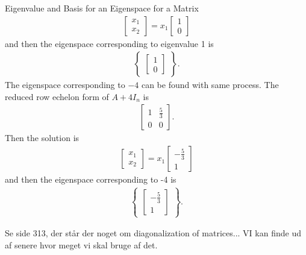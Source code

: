 \begin{example}{Eigenvalue and Basis for an Eigenspace for a Matrix}
\begin{align*}
\begin{bmatrix}
            x_1\\x_2
        \end{bmatrix}=x_1
         \begin{bmatrix}
            1\\0
        \end{bmatrix}
    \end{align*}
    and then the eigenspace corresponding to eigenvalue 1 is
    \begin{align*}
    \begin{Bmatrix}
        \begin{bmatrix}
            1\\0
        \end{bmatrix}
    \end{Bmatrix}.
    \end{align*}
    The eigenspace corresponding to $-4$ can be found with same process.
    The reduced row echelon form of $A+4I_n$ is
        \begin{align*}
            \begin{bmatrix}
                1 & \frac{5}{3}\\
                0 & 0
            \end{bmatrix}.
    \end{align*}
    Then the solution is 
    \begin{align*}
        \begin{bmatrix}
            x_1\\x_2
        \end{bmatrix}=x_1
         \begin{bmatrix}
            -\frac{5}{3}\\1
        \end{bmatrix}
    \end{align*}
    and then the eigenspace corresponding to -4 is
    \begin{align*}
    \begin{Bmatrix}
        \begin{bmatrix}
            -\frac{5}{3}\\1
        \end{bmatrix}
    \end{Bmatrix}.
    \end{align*}
\end{example}



Se side 313, der står der noget om diagonalization of matrices... VI kan finde ud af senere hvor meget vi skal bruge af det. 

